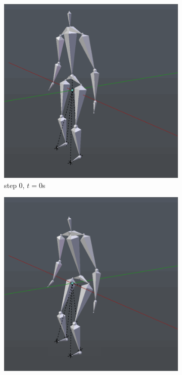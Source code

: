 \documentclass[10pt,twocolumn,letterpaper]{article}
\begin{document}
\begin{figure}
    \centering
    \begin{subfigure}{0.2\textwidth}
        \centering
        \includegraphics[width=.9\linewidth]{sit-0.png}
        \caption{step 0, $t=0$s}
    \end{subfigure}\begin{subfigure}{0.2\textwidth}
        \centering
        \includegraphics[width=.9\linewidth]{sit-1.png}

\end{subfigure}
\end{figure}
\end{document}

